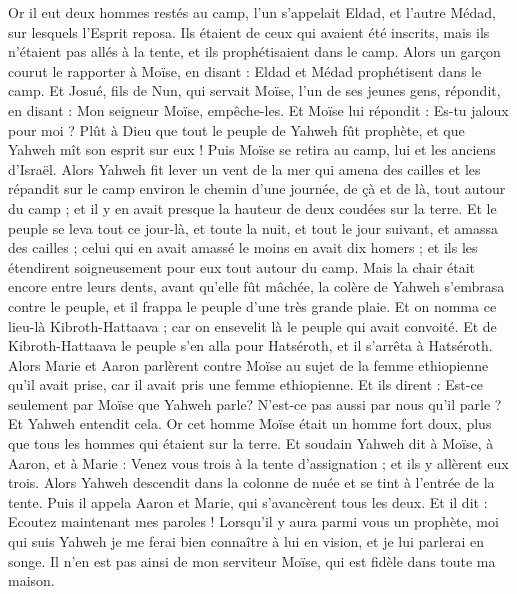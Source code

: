 \begin{multicols}{2}
Or il eut deux hommes restés au camp, l'un s'appelait Eldad, et l'autre Médad, sur lesquels l'Esprit reposa. Ils étaient de ceux qui avaient été inscrits, mais ils n'étaient pas allés à la tente, et ils prophétisaient dans le camp.
Alors un garçon courut le rapporter à Moïse, en disant : Eldad et Médad prophétisent dans le camp.
Et Josué, fils de Nun, qui servait Moïse, l’un de ses jeunes gens, répondit, en disant : Mon seigneur Moïse, empêche-les.
Et Moïse lui répondit : Es-tu jaloux pour moi ? Plût à Dieu que tout le peuple de Yahweh fût prophète, et que Yahweh mît son esprit sur eux !
Puis Moïse se retira au camp, lui et les anciens d'Israël.
Alors Yahweh fit lever un vent de la mer qui amena des cailles et les répandit sur le camp environ le chemin d'une journée, de çà et de là, tout autour du camp ; et il y en avait presque la hauteur de deux coudées sur la terre.
Et le peuple se leva tout ce jour-là, et toute la nuit, et tout le jour suivant, et amassa des cailles ; celui qui en avait amassé le moins en avait dix homers ; et ils les étendirent soigneusement pour eux tout autour du camp.
Mais la chair était encore entre leurs dents, avant qu’elle fût mâchée, la colère de Yahweh s'embrasa contre le peuple, et il frappa le peuple d'une très grande plaie.
Et on nomma ce lieu-là Kibroth-Hattaava ; car on ensevelit là le peuple qui avait convoité.
Et de Kibroth-Hattaava le peuple s'en alla pour Hatséroth, et il s'arrêta à Hatséroth.
\VerseOne{}Alors Marie et Aaron parlèrent contre Moïse au sujet de la femme ethiopienne qu'il avait prise, car il avait pris une femme ethiopienne.
Et ils dirent : Est-ce seulement par Moïse que Yahweh parle? N'est-ce pas aussi par nous qu'il parle ? Et Yahweh entendit cela. 
Or cet homme Moïse était un homme fort doux, plus que tous les hommes qui étaient sur la terre.
Et soudain Yahweh dit à Moïse, à Aaron, et à Marie : Venez vous trois à la tente d’assignation ; et ils y allèrent eux trois.
Alors Yahweh descendit dans la colonne de nuée et se tint à l'entrée de la tente. Puis il appela Aaron et Marie, qui s'avancèrent tous les deux.
Et il dit : Ecoutez maintenant mes paroles ! Lorsqu'il y aura parmi vous un prophète, moi qui suis Yahweh je me ferai bien connaître à lui en vision, et je lui parlerai en songe.
Il n'en est pas ainsi de mon serviteur Moïse, qui est fidèle dans toute ma maison.

\end{multicols}
